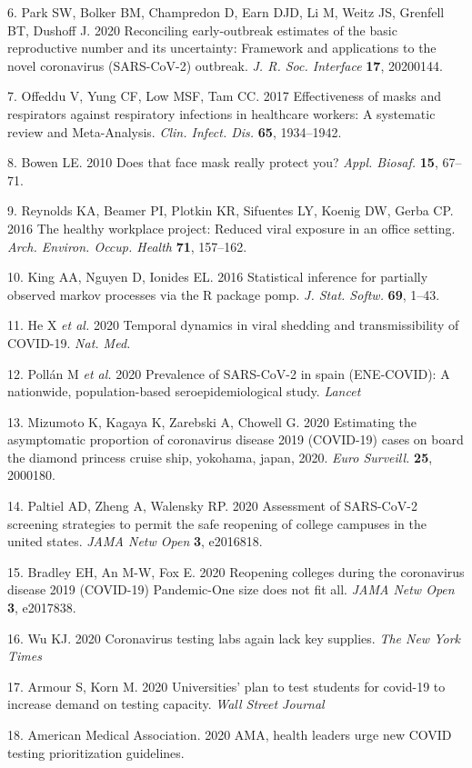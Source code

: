\documentclass[
]{article}
\begin{document}
\leavevmode\hypertarget{ref-Park2020-vl}{}%
6. Park SW, Bolker BM, Champredon D, Earn DJD, Li M, Weitz JS, Grenfell
BT, Dushoff J. 2020 Reconciling early-outbreak estimates of the basic
reproductive number and its uncertainty: Framework and applications to
the novel coronavirus (SARS-CoV-2) outbreak. \emph{J. R. Soc. Interface}
\textbf{17}, 20200144.

\leavevmode\hypertarget{ref-Offeddu2017-ae}{}%
7. Offeddu V, Yung CF, Low MSF, Tam CC. 2017 Effectiveness of masks and
respirators against respiratory infections in healthcare workers: A
systematic review and Meta-Analysis. \emph{Clin. Infect. Dis.}
\textbf{65}, 1934--1942.

\leavevmode\hypertarget{ref-Bowen2010-ht}{}%
8. Bowen LE. 2010 Does that face mask really protect you? \emph{Appl.
Biosaf.} \textbf{15}, 67--71.

\leavevmode\hypertarget{ref-Reynolds2016-oy}{}%
9. Reynolds KA, Beamer PI, Plotkin KR, Sifuentes LY, Koenig DW, Gerba
CP. 2016 The healthy workplace project: Reduced viral exposure in an
office setting. \emph{Arch. Environ. Occup. Health} \textbf{71},
157--162.

\leavevmode\hypertarget{ref-King2016-ra}{}%
10. King AA, Nguyen D, Ionides EL. 2016 Statistical inference for
partially observed markov processes via the R package pomp. \emph{J.
Stat. Softw.} \textbf{69}, 1--43.

\leavevmode\hypertarget{ref-He2020-pq}{}%
11. He X \emph{et al.} 2020 Temporal dynamics in viral shedding and
transmissibility of COVID-19. \emph{Nat. Med.}

\leavevmode\hypertarget{ref-Pollan2020-xb}{}%
12. Pollán M \emph{et al.} 2020 Prevalence of SARS-CoV-2 in spain
(ENE-COVID): A nationwide, population-based seroepidemiological study.
\emph{Lancet}

\leavevmode\hypertarget{ref-Mizumoto2020-qc}{}%
13. Mizumoto K, Kagaya K, Zarebski A, Chowell G. 2020 Estimating the
asymptomatic proportion of coronavirus disease 2019 (COVID-19) cases on
board the diamond princess cruise ship, yokohama, japan, 2020.
\emph{Euro Surveill.} \textbf{25}, 2000180.

\leavevmode\hypertarget{ref-Paltiel2020-yp}{}%
14. Paltiel AD, Zheng A, Walensky RP. 2020 Assessment of SARS-CoV-2
screening strategies to permit the safe reopening of college campuses in
the united states. \emph{JAMA Netw Open} \textbf{3}, e2016818.

\leavevmode\hypertarget{ref-Bradley2020-ig}{}%
15. Bradley EH, An M-W, Fox E. 2020 Reopening colleges during the
coronavirus disease 2019 (COVID-19) Pandemic-One size does not fit all.
\emph{JAMA Netw Open} \textbf{3}, e2017838.

\leavevmode\hypertarget{ref-Wu2020-bc}{}%
16. Wu KJ. 2020 Coronavirus testing labs again lack key supplies.
\emph{The New York Times}

\leavevmode\hypertarget{ref-Armour2020-pr}{}%
17. Armour S, Korn M. 2020 Universities' plan to test students for
covid-19 to increase demand on testing capacity. \emph{Wall Street
Journal}

\leavevmode\hypertarget{ref-American_Medical_Association2020-mi}{}%
18. American Medical Association. 2020 AMA, health leaders urge new
COVID testing prioritization guidelines.
\end{document}
